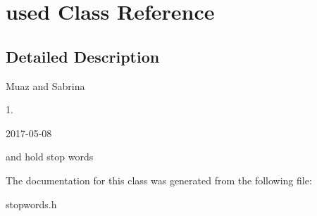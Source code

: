 \hypertarget{classused}{}\section{used Class Reference}
\label{classused}


\subsection{Detailed Description}
Muaz and Sabrina

1.

2017-\/05-\/08

and hold stop words 

The documentation for this class was generated from the following file\+:\begin{DoxyCompactItemize}
\item 
stopwords.\+h\end{DoxyCompactItemize}
